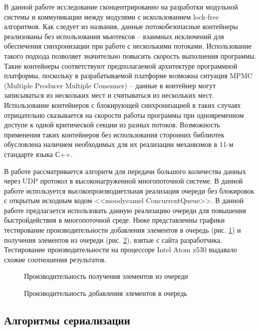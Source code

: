 В данной работе исследование сконцентрированно на разработки модульной системы и коммуникации между модулями с искользованием lock-free алгоритмов. Как следует из названия, данные потокобезопасные контейнеры реализованы без использования мьютексов – взаимных исключений для обеспечения синхронизации при работе с несколькими потоками. Использование такого подхода позволяет значительно повысить скорость выполнения программы. Такие контейнеры соответствуют предполагаемой архитектуре программной платформы, поскольку в разрабатываемой платформе возможна ситуация MPMC (Multiple Producer Multiple Consumer) – данные в контейнер могут записываться из нескольких мест и считываться из нескольких мест. Использование контейнеров с блокирующей синхронизацией в таких случаях отрицательно сказывается на скорости работы программы при одновременном доступе к одной критической секции из разных потоков. Возможность применения таких контейнеров без использования сторонних библиотек обусловлена наличием необходимых для их реализации механизмов в 11-м стандарте языка С++.

В работе \cite{syzovalgorithm} рассматривается алгоритм для передачи большого количества данных через UDP протокол в высоконагруженной многопоточной системе. В данной работе используется высокопроизводиетльная реализация очереди без блокировок с открытым исходным кодом <<moodycamel ConcurrentQueue>>. В данной работе предлагается использовать данную реализацию очереди для повышения быстройдействия в многопоточной среде. Ниже представленны графики тестирование производительности добавления элементов в очередь (рис. \ref{im:2_1_2_dequeue}) и получения элементов из очереди (рис. \ref{im:2_1_3_enqueue}), взятые с сайта разработчика. Тестирование производительности на процессоре Intel Atom z530 выдавало схожие соотношения результатов.

\begin{figure}[htb]
    \caption{Производительность получения элементов из очереди}
    \label{im:2_1_2_dequeue}
\end{figure}

\begin{figure}[htb]
    \caption{Производительность добавления элементов в очередь}
    \label{im:2_1_3_enqueue}
\end{figure}

\subsection{Алгоритмы сериализации}

